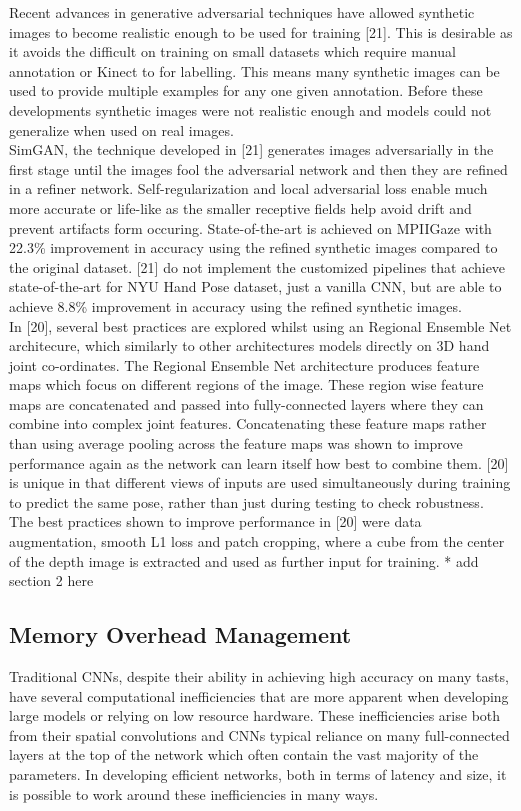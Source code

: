 \documentclass{article}
\begin{document}
Recent advances in generative adversarial techniques have allowed synthetic images to become realistic enough to be used for training [21]. This is desirable as it avoids the difficult on training on small datasets which require manual annotation or  Kinect to for labelling. This means many synthetic images can be used to provide multiple examples for any one given annotation. Before these developments synthetic images were not realistic enough and models could not generalize when used on real images.\\

SimGAN, the technique developed in [21] generates images adversarially in the first stage until the images fool the adversarial network and then they are refined  in a refiner network. Self-regularization and local adversarial loss enable much more accurate or life-like as the smaller receptive fields help avoid drift and prevent artifacts form occuring. State-of-the-art is achieved on MPIIGaze with 22.3\% improvement in accuracy using the refined synthetic images compared to the original dataset. [21] do not implement the customized pipelines that achieve state-of-the-art for NYU Hand Pose dataset, just a vanilla CNN, but are able to achieve 8.8\% improvement in accuracy using the refined synthetic images.\\

In [20], several best practices are explored whilst using an Regional Ensemble Net architecure, which similarly to other architectures models directly on 3D hand joint co-ordinates. The Regional Ensemble Net architecture produces feature maps which focus on different regions of the image. These region wise feature maps are concatenated and passed into fully-connected layers where they can combine into complex joint features. Concatenating these feature maps rather than using average pooling across the feature maps was shown to improve performance again as the network can learn itself how best to combine them. [20] is unique in that different views of inputs are used simultaneously during training to predict the same pose, rather than just during testing to check robustness. \\

The best practices shown to improve performance in [20] were data augmentation, smooth L1 loss and patch cropping, where a cube from the center of the depth image is extracted and used as further input for training. * add section 2 here

\subsection*{Memory Overhead Management}
Traditional CNNs, despite their ability in achieving high accuracy on many tasts, have several computational inefficiencies that are more apparent when developing large models or relying on low resource hardware. These inefficiencies  arise both from their spatial convolutions and CNNs typical reliance on many full-connected layers at the top of the network which often contain the vast majority of the parameters. In developing efficient networks, both in terms of latency and size, it is possible to work around these inefficiencies in many ways.\\
\end{document}
